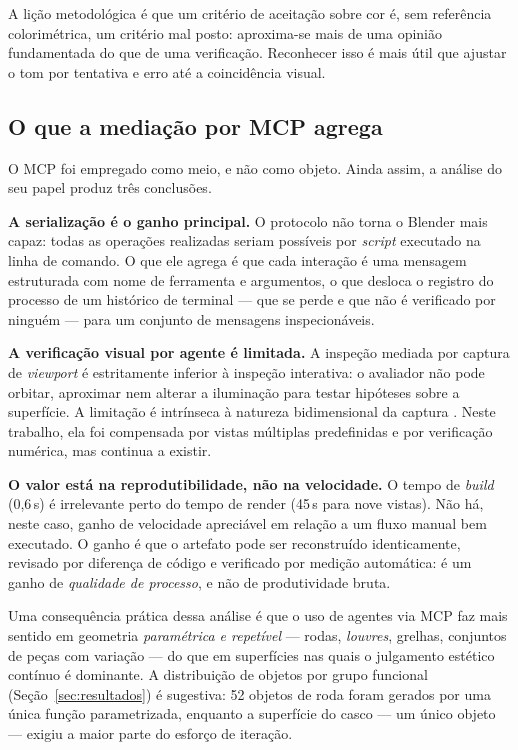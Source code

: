 A li\c{c}\~ao metodol\'ogica \'e que um crit\'erio de aceita\c{c}\~ao sobre cor \'e, sem
refer\^encia colorim\'etrica, um crit\'erio mal posto: aproxima-se mais de uma opini\~ao
fundamentada do que de uma verifica\c{c}\~ao. Reconhecer isso \'e mais \'util que ajustar o
tom por tentativa e erro at\'e a coincid\^encia visual.

\subsection{O que a media\c{c}\~ao por MCP agrega}

O MCP foi empregado como meio, e n\~ao como objeto. Ainda assim, a an\'alise do seu papel
produz tr\^es conclus\~oes.

\textbf{A serializa\c{c}\~ao \'e o ganho principal.} O protocolo n\~ao torna o Blender mais
capaz: todas as opera\c{c}\~oes realizadas seriam poss\'iveis por \emph{script} executado na
linha de comando. O que ele agrega \'e que cada intera\c{c}\~ao \'e uma mensagem estruturada
com nome de ferramenta e argumentos, o que desloca o registro do processo de um
hist\'orico de terminal --- que se perde e que n\~ao \'e verificado por ningu\'em --- para
um conjunto de mensagens inspecion\'aveis.

\textbf{A verifica\c{c}\~ao visual por agente \'e limitada.} A inspe\c{c}\~ao mediada por
captura de \emph{viewport} \'e estritamente inferior \`a inspe\c{c}\~ao interativa: o
avaliador n\~ao pode orbitar, aproximar nem alterar a ilumina\c{c}\~ao para testar
hip\'oteses sobre a superf\'icie. A limita\c{c}\~ao \'e intr\'inseca \`a natureza
bidimensional da captura \cite{hartley2004}. Neste trabalho, ela foi compensada por vistas
m\'ultiplas predefinidas e por verifica\c{c}\~ao num\'erica, mas continua a existir.

\textbf{O valor est\'a na reprodutibilidade, n\~ao na velocidade.} O tempo de \emph{build}
(0,6\,s) \'e irrelevante perto do tempo de render (45\,s para nove vistas). N\~ao h\'a,
neste caso, ganho de velocidade apreci\'avel em rela\c{c}\~ao a um fluxo manual bem
executado. O ganho \'e que o artefato pode ser reconstru\'ido identicamente, revisado por
diferen\c{c}a de c\'odigo e verificado por medi\c{c}\~ao autom\'atica: \'e um ganho de
\emph{qualidade de processo}, e n\~ao de produtividade bruta.

Uma consequ\^encia pr\'atica dessa an\'alise \'e que o uso de agentes via MCP faz mais
sentido em geometria \emph{param\'etrica e repet\'ivel} --- rodas, \emph{louvres}, grelhas,
conjuntos de pe\c{c}as com varia\c{c}\~ao --- do que em superf\'icies nas quais o julgamento
est\'etico cont\'inuo \'e dominante. A distribui\c{c}\~ao de objetos por grupo funcional
(Se\c{c}\~ao~\ref{sec:resultados}) \'e sugestiva: 52 objetos de roda foram gerados por uma
\'unica fun\c{c}\~ao parametrizada, enquanto a superf\'icie do casco --- um \'unico
objeto --- exigiu a maior parte do esfor\c{c}o de itera\c{c}\~ao.

